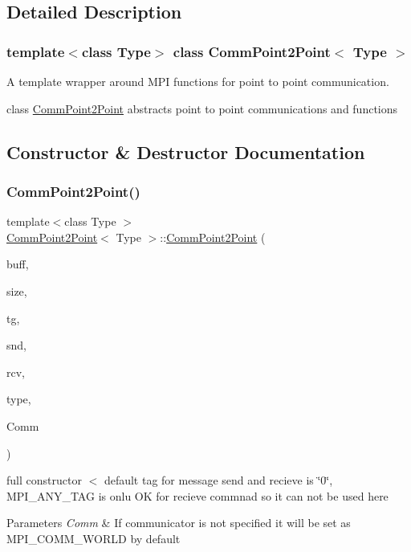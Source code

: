 \subsection{Detailed Description}
\subsubsection*{template$<$class Type$>$\newline
class Comm\+Point2\+Point$<$ Type $>$}

A template wrapper around M\+PI functions for point to point communication. 

class \mbox{\hyperlink{classCommPoint2Point}{Comm\+Point2\+Point}} abstracts point to point communications and functions 

\subsection{Constructor \& Destructor Documentation}
\mbox{\label{classCommPoint2Point_aa23f80d9c92ccc7d1ce601ec829c6ff7}} 
\subsubsection{\texorpdfstring{Comm\+Point2\+Point()}{CommPoint2Point()}\hspace{0.1cm}{\footnotesize\ttfamily [1/3]}}
{\footnotesize\ttfamily template$<$class Type $>$ \\
\mbox{\hyperlink{classCommPoint2Point}{Comm\+Point2\+Point}}$<$ Type $>$\+::\mbox{\hyperlink{classCommPoint2Point}{Comm\+Point2\+Point}} (\begin{DoxyParamCaption}\item[{void $\ast$}]{buff,  }\item[{uint}]{size,  }\item[{uint $\ast$}]{tg,  }\item[{uint}]{snd,  }\item[{uint}]{rcv,  }\item[{uint}]{type,  }\item[{M\+P\+I\+\_\+\+Comm}]{Comm }\end{DoxyParamCaption})}

full constructor $<$ default tag for message send and recieve is \char`\"{}0\char`\"{}, M\+P\+I\+\_\+\+A\+N\+Y\+\_\+\+T\+AG is onlu OK for recieve commnad so it can not be used here 
\begin{DoxyParams}{Parameters}
{\em Comm} & If communicator is not specified it will be set as M\+P\+I\+\_\+\+C\+O\+M\+M\+\_\+\+W\+O\+R\+LD by default \\
\hline
\end{DoxyParams}
\mbox{\label{classCommPoint2Point_a2d595c46eb1c130069ad90c9782cf63e}} 
